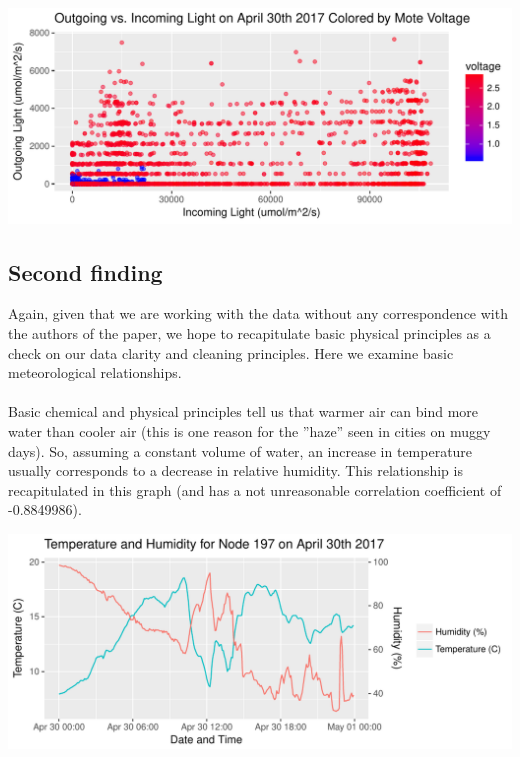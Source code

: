 \documentclass[english]{article}\usepackage[]{graphicx}\usepackage[]{color}
\makeatletter
\def\maxwidth{ %
  \ifdim\Gin@nat@width>\linewidth
    \linewidth
  \else
    \Gin@nat@width
  \fi
}
\newenvironment{knitrout}{}{} %
\makeatother
\begin{document}
\begin{knitrout}
\color{fgcolor}

{\centering \includegraphics[width=\maxwidth]{figure/q1p2-1} 

}



\end{knitrout}

\subsection{Second finding}

Again, given that we are working with the data without any correspondence
with the authors of the paper, we hope to recapitulate basic physical principles 
as a check on our data clarity and cleaning principles.  Here we examine basic meteorological relationships.\\\\
Basic chemical and physical principles tell us that warmer air can bind more
water than cooler air (this is one reason for the ''haze'' seen in cities on muggy days).
So, assuming a constant volume of water, an increase in temperature usually
corresponds to a decrease in relative humidity.  This relationship is recapitulated
in this graph (and has a not unreasonable correlation coefficient of 
-0.8849986).\\

\begin{knitrout}
\color{fgcolor}

{\centering \includegraphics[width=\maxwidth]{figure/q2-1} 

}



\end{knitrout}
\end{document}
